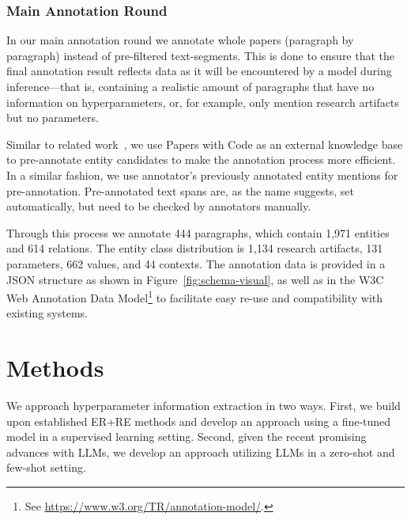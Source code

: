 \subsubsection{Main Annotation Round}


In our main annotation round we annotate whole papers (paragraph by paragraph) instead of pre-filtered text-segments. This is done to ensure that the final annotation result reflects data as it will be encountered by a model during inference---that is, containing a realistic amount of paragraphs that have no information on hyperparameters, or, for example, only mention research artifacts but no parameters.

Similar to related work~\cite{Jain2020scirex}, we use Papers with Code as an external knowledge base to pre-annotate entity candidates to make the annotation process more efficient. In a similar fashion, we use annotator's previously annotated entity mentions for pre-annotation. Pre-annotated text spans are, as the name suggests, set automatically, but need to be checked by annotators manually.

Through this process we annotate 444 paragraphs, which contain 1,971 entities and 614 relations. The entity class distribution is 1,134 research artifacts, 131 parameters, 662 values, and 44 contexts. The annotation data is provided in a JSON structure as shown in Figure~\ref{fig:schema-visual}, as well as in the W3C Web Annotation Data Model\footnote{See \url{https://www.w3.org/TR/annotation-model/}.} to facilitate easy re-use and compatibility with existing systems.




\section{Methods}\label{sec:methods}

We approach hyperparameter information extraction in two ways. First, we build upon established ER+RE methods and develop an approach using a fine-tuned model in a supervised learning setting. Second, given the recent promising advances with LLMs, we develop an approach utilizing LLMs in a zero-shot and few-shot setting.

